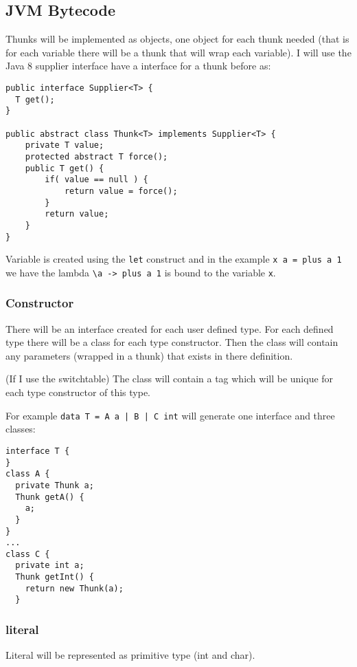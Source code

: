 \documentclass[12pt,a4paper,twoside]{article}
\begin{document}
\subsection{JVM Bytecode}

Thunks will be implemented as objects, one object for each thunk needed 
(that is for each variable there will be a thunk that will wrap each variable).
I will use the Java 8 supplier interface have a interface for a thunk before as:


\begin{verbatim}
public interface Supplier<T> {
  T get();
}

public abstract class Thunk<T> implements Supplier<T> {
    private T value;
    protected abstract T force();
    public T get() {
        if( value == null ) {
            return value = force();
        }
        return value;
    }
}
\end{verbatim}

Variable is created using the \texttt{let} construct and in the example \texttt{x a = plus a 1} we have
the lambda \texttt{\textbackslash a -> plus a 1} is bound to the variable \texttt{x}.

\subsubsection{Constructor}

There will be an interface created for each user defined type. 
For each defined type there will be a class for each type constructor. 
Then the class will contain any parameters (wrapped in a thunk) that exists in there definition.

(If I use the switchtable)
The class will contain a tag which will be unique for each type constructor of this type.

For example \texttt{data T = A a | B | C int} will generate one interface and three classes:

\begin{verbatim}
interface T {
}
class A {
  private Thunk a;
  Thunk getA() {
    a;
  }
}
...
class C {
  private int a;
  Thunk getInt() {
    return new Thunk(a);
  }
\end{verbatim}

\subsubsection{literal}

Literal will be represented as primitive type (int and char).
\end{document}
